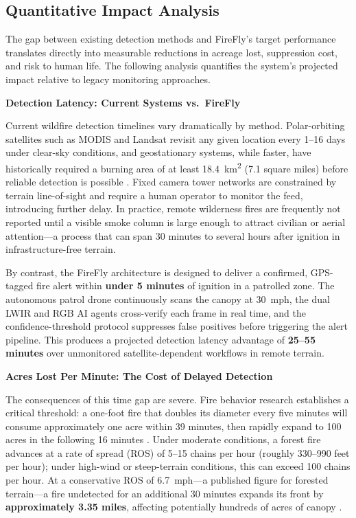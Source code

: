 \documentclass[journal, onecolumn]{IEEEtran}
\begin{document}
\subsection{Quantitative Impact Analysis}

The gap between existing detection methods and FireFly's target performance
translates directly into measurable reductions in acreage lost, suppression
cost, and risk to human life. The following analysis quantifies the system's
projected impact relative to legacy monitoring approaches.

\vspace{1em}

\textbf{Detection Latency: Current Systems vs.\ FireFly}

Current wildfire detection timelines vary dramatically by method. Polar-orbiting
satellites such as MODIS and Landsat revisit any given location every 1--16 days
under clear-sky conditions, and geostationary systems, while faster, have
historically required a burning area of at least 18.4~km\textsuperscript{2}
(7.1 square miles) before reliable detection is possible \cite{ieee_uav_iot_detection}.
Fixed camera tower networks are constrained by terrain line-of-sight and require
a human operator to monitor the feed, introducing further delay. In practice,
remote wilderness fires are frequently not reported until a visible smoke column
is large enough to attract civilian or aerial attention---a process that can span
30 minutes to several hours after ignition in infrastructure-free terrain.

By contrast, the FireFly architecture is designed to deliver a confirmed,
GPS-tagged fire alert within \textbf{under 5 minutes} of ignition in a
patrolled zone. The autonomous patrol drone continuously scans the canopy
at 30~mph, the dual LWIR and RGB AI agents cross-verify each frame in real
time, and the confidence-threshold protocol suppresses false positives before
triggering the alert pipeline. This produces a projected detection latency
advantage of \textbf{25--55 minutes} over unmonitored satellite-dependent
workflows in remote terrain.

\vspace{1em}

\textbf{Acres Lost Per Minute: The Cost of Delayed Detection}

The consequences of this time gap are severe. Fire behavior research
establishes a critical threshold: a one-foot fire that doubles its diameter
every five minutes will consume approximately one acre within 39 minutes,
then rapidly expand to 100 acres in the following 16 minutes \cite{remote_sensing_signaling}.
Under moderate conditions, a forest fire advances at a rate of spread (ROS)
of 5--15 chains per hour (roughly 330--990 feet per hour); under high-wind
or steep-terrain conditions, this can exceed 100 chains per hour. At a
conservative ROS of 6.7~mph---a published figure for forested terrain---a
fire undetected for an additional 30 minutes expands its front by
\textbf{approximately 3.35 miles}, affecting potentially hundreds of acres
of canopy \cite{earthsky_spread}.
\end{document}
